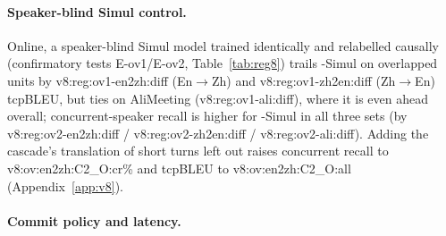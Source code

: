 \paragraph{Speaker-blind Simul control.} Online, a speaker-blind Simul model trained identically and relabelled causally
(confirmatory tests E-ov1/E-ov2, Table~\ref{tab:reg8}) trails \sys{}-Simul on overlapped units by
\num{v8:reg:ov1-en2zh:diff} (En$\rightarrow$Zh) and \num{v8:reg:ov1-zh2en:diff} (Zh$\rightarrow$En) tcpBLEU, but ties on
AliMeeting (\num{v8:reg:ov1-ali:diff}), where it is even ahead overall; concurrent-speaker recall is higher for
\sys{}-Simul in all three sets (by \num{v8:reg:ov2-en2zh:diff} / \num{v8:reg:ov2-zh2en:diff} /
\num{v8:reg:ov2-ali:diff}). Adding the cascade's translation of short turns \sys{} left out raises concurrent recall to
\num{v8:ov:en2zh:C2_O:cr}\% and tcpBLEU to \num{v8:ov:en2zh:C2_O:all} (Appendix~\ref{app:v8}).

\paragraph{Commit policy and latency.}
\label{sec:res-simul}
\label{sec:res-latency}



